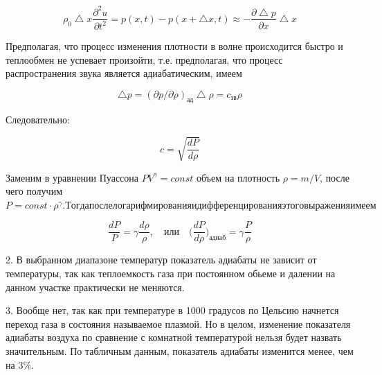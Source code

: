\documentclass[12pt,a4paper]{article}
\begin{document}
\[\rho_0 \bigtriangleup x \frac{\partial^2 u}{\partial t^2} = p(x,t) -  p(x + \bigtriangleup x, t) \approx - \frac{\partial \bigtriangleup p}{\partial x} \bigtriangleup x\]

Предполагая, что процесс изменения плотности в волне происходится быстро и теплообмен не успевает произойти, т.е. предполагая, что процесс распространения звука является адиабатическим, имеем

\[\bigtriangleup p = (\partial p/ \partial \rho)_{\textit{ад}} \bigtriangleup \rho = c_{\textit{зв}}  \rho\]

Следовательно:

\[c = \sqrt{\frac{dP}{d \rho}}\]

Заменим в уравнении Пуассона $PV^{\gamma} = const$ объем на плотность $\rho = m/V$, после чего получим $P = const \cdot \rho^{\gamma}. Тогда после логарифмирования и дифференцирования этого выражения имеем$

\[\frac{dP}{P} = \gamma \frac{d \rho}{\rho}, \quad \textit{или} \quad \Big( \frac{dP}{d \rho}\Big)_{\textit{адиаб}} = \gamma \frac{P}{\rho}\]

\vspace{0.5cm}

2. В выбранном диапазоне температур показатель адиабаты не зависит от температуры, так как теплоемкость газа при постоянном обьеме и далении на данном участке практически не меняются.

\vspace{0.5cm}

3. Вообще нет, так как при температуре в 1000 градусов по Цельсию начнется переход газа в состояния называемое плазмой. Но в целом, изменение показателя адиабаты воздуха по сравнение с комнатной температурой нельзя будет назвать значительным. По табличным данным, показатель адиабаты изменится менее, чем на $3 \%$.
\end{document}
